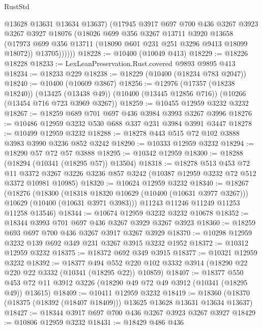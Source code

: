 \begin{lexlean}{RustStd}
\begin{coremodule}
{\begin{coremodule}
{{{{{{{{{{{{{{{{{{{{{{{{{              @13628
              @13631
              @13634
              @13637)
            (@17945
              @3917
              @697
              @700
              @436
              @3267
              @3923
              @3267
              @3927
              @18076
              (@18026
                @699
                @356
                @3267
                @13711
                @3920
                @13658
                (@17973 @699 @356 @13711 (@18090 @601 @231 @251 @3296 @9413 @18099 @18072))
                @13705))))))
@18228 := @10400 (@10049 @413)
@18229 := @18226 @18228
@18233 := LexLeanPreservation.Rust.covered @9893 @9895 @413
@18234 := @18233 @229
@18238 := @18229 (@10400 (@18234 @783 @2047))
@18240 := @10400 (@10609 @3867)
@18256 := @12976
    (@17357 (@18238 @18240))
    (@13425 (@13438 @49))
    (@10400 (@13445 @12856 @716))
    (@10266 (@13454 @716 @723 @3969 @3267))
@18259 := @10455 @12959 @3232 @3232
@18267 := @18259 @689 @701 @697 @436 @3984 @3993 @3267 @3996
@18276 := @10486 @12959 @3232 @530 @688 @337 @231 @3984 @3991 @3447
@18278 := @10499 @12959 @3232
@18288 := @18278 @443 @515 @72 @102 @3888 @3983 @3990 @3236 @852 @3242
@18290 := @10333 @12959 @3232
@18294 := @18290 @57 @72 @57 @3888
@18295 := @10342 @12959
@18300 := @18288 (@18294 (@10341 (@18295 @57)) @13504)
@18318 := @18278
    @513
    @453
    @72
    @11
    @3372
    @3267
    @3226
    @3236
    @857
    @3242
    (@10387 @12959 @3232 @72 @512 @3372 @10981 @10985)
@18320 := @10624 @12959 @3232
@18340 := @18267
    (@18276
      (@18300
        (@18318 @18320 @10629 (@10400 (@10631 @3977 @3267)))
        @10629
        (@10400 (@10631 @3971 @3983)))
      @11243
      @11246
      @11249
      @11253
      @11258
      @13546)
@18344 := @10674 @12959 @3232 @3232 @10678
@18352 := @18344 @3993 @701 @697 @436 @3267 @3929 @3267 @3923
@18360 := @18259 @693 @697 @700 @436 @3267 @3917 @3267 @3929
@18370 := @10298 @12959 @3232 @139 @692 @349 @231 @3267 @3915 @3232 @1952
@18372 := @10312 @12959 @3232
@18375 := @18372 @692 @349 @3915
@18377 := @10321 @12959 @3232
@18392 := @18377
    @494
    @552
    @220
    @102
    @3332
    @3914
    (@18290 @22 @220 @22 @3332 (@10341 (@18295 @22)) @10859)
@18407 := @18377
    @550
    @453
    @72
    @11
    @3912
    @3226
    (@18290 @49 @72 @49 @3912 (@10341 (@18295 @49)) @13615)
@18409 := @10411 @12959 @3232
@18419 := @18360 (@18370 (@18375 (@18392 (@18407 @18409))) @13625 @13628 @13631 @13634 @13637)
@18427 := @18344 @3917 @697 @700 @436 @3267 @3923 @3267 @3927
@18429 := @10806 @12959 @3232
@18431 := @18429 @486 @436
}}}}}}}}}}}}}}}}}}}}}}}}}
\end{coremodule}}
\end{coremodule}
\end{lexlean}

